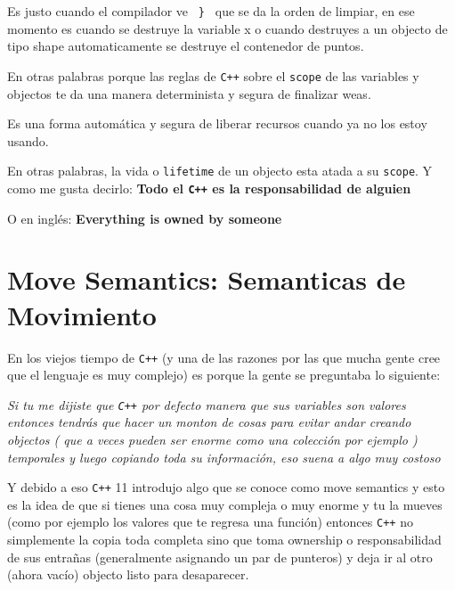 \documentclass[12pt, fleqn]{report}                             %
\theoremstyle{break}                                            %
\newcommand \Cpp  {\texttt{C++} }                               %
\begin{document}
            Es justo cuando el compilador ve \texttt{ \} } que se da la orden de limpiar,
            en ese momento es cuando se destruye la variable x o cuando destruyes a un objecto
            de tipo shape automaticamente se destruye el contenedor de puntos.
            
            En otras palabras porque las reglas de \Cpp sobre el \texttt{scope} de las variables
            y objectos te da una manera determinista y segura de finalizar weas.

            Es una forma automática y segura de liberar recursos cuando ya no los estoy usando.

            En otras palabras, la vida o \texttt{lifetime} de un objecto esta atada a su \texttt{scope}.
            Y como me gusta decirlo:
            \textbf{
                Todo el \Cpp es la responsabilidad de alguien
            }

            O en inglés:
            \textbf{
                Everything is owned by someone
            }

            \cite{ModernCppWhatYouNeedToKnow}

        \clearpage
        \section{Move Semantics: Semanticas de Movimiento}     
        
            En los viejos tiempo de \Cpp (y una de las razones por las que mucha gente cree que 
            el lenguaje es muy complejo) es porque la gente se preguntaba lo siguiente:

            \textit{Si tu me dijiste que \Cpp por defecto manera que sus variables son valores
            entonces tendrás que hacer un monton de cosas para evitar andar creando objectos (
                que a veces pueden ser enorme como una colección por ejemplo
            ) temporales y luego copiando toda su información, eso suena a algo muy costoso}

            Y debido a eso \Cpp 11 introdujo algo que se conoce como move semantics
            y esto es la idea de que si tienes una cosa muy compleja o muy enorme y tu la mueves
            (como por ejemplo los valores que te regresa una función) entonces \Cpp no simplemente 
            la copia toda completa sino que toma ownership o responsabilidad de sus entrañas
            (generalmente asignando un par de punteros) y deja ir al otro (ahora vacío) objecto listo para
            desaparecer.
\end{document}

